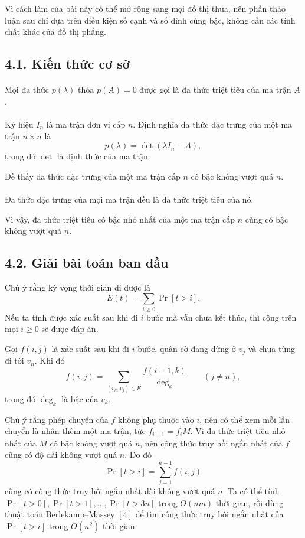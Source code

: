 \documentclass[11pt]{article}
\begin{document}
Vì cách làm của bài này có thể mở rộng sang mọi đồ thị thưa, nên phần thảo
luận sau chỉ dựa trên điều kiện số cạnh và số đỉnh cùng bậc, không cần các
tính chất khác của đồ thị phẳng.

\subsection*{4.1. Kiến thức cơ sở}

\paragraph{}
Mọi đa thức \(p(\lambda)\) thỏa \(p(A)=0\) được gọi là đa thức triệt tiêu của
ma trận \(A\).

\paragraph{}
Ký hiệu \(I_n\) là ma trận đơn vị cấp \(n\). Định nghĩa đa thức đặc trưng của
một ma trận \(n\times n\) là
\[
  p(\lambda)=\det(\lambda I_n-A),
\]
trong đó \(\det\) là định thức của ma trận.

Dễ thấy đa thức đặc trưng của một ma trận cấp \(n\) có bậc không vượt quá
\(n\).

\paragraph{}
Đa thức đặc trưng của mọi ma trận đều là đa thức triệt tiêu của nó.

Vì vậy, đa thức triệt tiêu có bậc nhỏ nhất của một ma trận cấp \(n\) cũng có
bậc không vượt quá \(n\).

\subsection*{4.2. Giải bài toán ban đầu}

Chú ý rằng kỳ vọng thời gian đi được là
\[
  E(t)=\sum_{i\ge0}\Pr[t>i].
\]
Nếu ta tính được xác suất sau khi đi \(i\) bước mà vẫn chưa kết thúc, thì cộng
trên mọi \(i\ge0\) sẽ được đáp án.

Gọi \(f(i,j)\) là xác suất sau khi đi \(i\) bước, quân cờ đang dừng ở \(v_j\)
và chưa từng đi tới \(v_n\). Khi đó
\[
  f(i,j)=\sum_{(v_k,v_j)\in E}\frac{f(i-1,k)}{\deg_k}\qquad(j\ne n),
\]
trong đó \(\deg_k\) là bậc của \(v_k\).

Chú ý rằng phép chuyển của \(f\) không phụ thuộc vào \(i\), nên có thể xem mỗi
lần chuyển là nhân thêm một ma trận, tức \(f_{i+1}=f_iM\). Vì đa thức triệt
tiêu nhỏ nhất của \(M\) có bậc không vượt quá \(n\), nên công thức truy hồi
ngắn nhất của \(f\) cũng có độ dài không vượt quá \(n\). Do đó
\[
  \Pr[t>i]=\sum_{j=1}^{n-1}f(i,j)
\]
cũng có công thức truy hồi ngắn nhất dài không vượt quá \(n\). Ta có thể tính
\(\Pr[t>0],\Pr[t>1],\ldots,\Pr[t>3n]\) trong \(O(nm)\) thời gian, rồi dùng
thuật toán Berlekamp--Massey \([4]\) để tìm công thức truy hồi ngắn nhất của
\(\Pr[t>i]\) trong \(O(n^2)\) thời gian.
\end{document}
